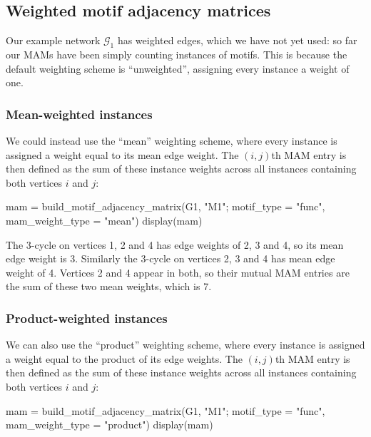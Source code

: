 \documentclass{article}
\begin{document}
\subsection{Weighted motif adjacency matrices}

Our example network $\mathcal{G}_1$ has weighted edges,
which we have not yet used:
so far our MAMs have been simply counting
instances of motifs.
This is because the default weighting scheme is
``unweighted'', assigning every instance a weight of one.

\subsubsection{Mean-weighted instances}

We could instead use the ``mean'' weighting scheme,
where every instance is assigned a weight equal to its
mean edge weight.
The $(i,j)$th MAM entry is then defined as the sum of these
instance weights across all instances containing
both vertices $i$ and $j$:

\begin{tcolorbox}[colback=black!5!white,colframe=black!15!white]
\begin{juliablock}
mam = build_motif_adjacency_matrix(G1, "M1"; motif_type = "func",
                                   mam_weight_type = "mean")
display(mam)
\end{juliablock}
\texttt{\obeylines\printpythontex}
\end{tcolorbox}

The 3-cycle on vertices 1, 2 and 4
has edge weights of 2, 3 and 4, so its mean edge weight is 3.
Similarly the 3-cycle on vertices 2, 3 and 4 has mean edge weight of 4.
Vertices 2 and 4 appear in both, so their mutual MAM entries are the
sum of these two mean weights, which is 7.

\subsubsection{Product-weighted instances}

We can also use the ``product'' weighting scheme,
where every instance is assigned a weight equal to the
product of its edge weights.
The $(i,j)$th MAM entry is then defined as the sum of these
instance weights across all instances containing
both vertices $i$ and $j$:

\begin{tcolorbox}[colback=black!5!white,colframe=black!15!white]
\begin{juliablock}
mam = build_motif_adjacency_matrix(G1, "M1"; motif_type = "func",
                                   mam_weight_type = "product")
display(mam)
\end{juliablock}
\texttt{\obeylines\printpythontex}
\end{tcolorbox}
\end{document}
